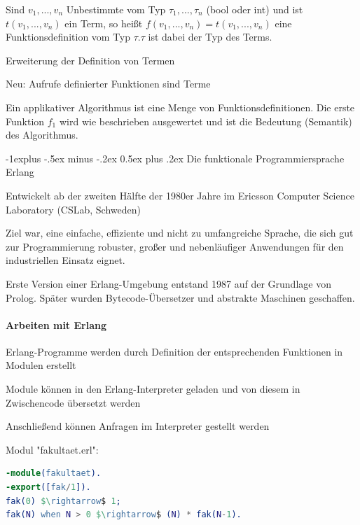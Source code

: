 \documentclass[10pt]{article}
\makeatletter
\renewcommand{\subsection}{\@startsection{subsection}{2}{0mm}%
                                {-1explus -.5ex minus -.2ex}%
                                {0.5ex plus .2ex}%
                                {\normalfont\normalsize\bfseries}}
\makeatother
\begin{document}
Sind $v_1, ..., v_n$ Unbestimmte vom Typ $\tau_1,...,\tau_n$ (bool oder int) und ist $t(v_1, ..., v_n)$ ein Term, so heißt $f(v_1, ..., v_n) = t(v_1, ..., v_n)$ eine Funktionsdefinition vom Typ $\tau .\tau$ ist dabei der Typ des Terms.

\begin{itemize*}
  \item Erweiterung der Definition von Termen
  \item Neu: Aufrufe definierter Funktionen sind Terme
\end{itemize*}

Ein applikativer Algorithmus ist eine Menge von Funktionsdefinitionen. Die erste Funktion $f_1$ wird wie beschrieben ausgewertet und ist die Bedeutung (Semantik) des Algorithmus.

\subsection{Die funktionale Programmiersprache Erlang}
\begin{itemize*}
  \item Entwickelt ab der zweiten Hälfte der 1980er Jahre im Ericsson Computer Science Laboratory (CSLab, Schweden)
  \item Ziel war, eine einfache, effiziente und nicht zu umfangreiche Sprache, die sich gut zur Programmierung robuster, großer und nebenläufiger Anwendungen für den industriellen Einsatz eignet.
  \item Erste Version einer Erlang-Umgebung entstand 1987 auf der Grundlage von Prolog. Später wurden Bytecode-Übersetzer und abstrakte Maschinen geschaffen.
\end{itemize*}

\paragraph{Arbeiten mit Erlang}

\begin{itemize*}
  \item Erlang-Programme werden durch Definition der entsprechenden Funktionen in Modulen erstellt
  \item Module können in den Erlang-Interpreter geladen und von diesem in Zwischencode übersetzt werden
  \item Anschließend können Anfragen im Interpreter gestellt werden
\end{itemize*}

Modul "fakultaet.erl":
\begin{lstlisting}[language=erlang]
-module(fakultaet).
-export([fak/1]).
fak(0) $\rightarrow$ 1;
fak(N) when N > 0 $\rightarrow$ (N) * fak(N-1).
\end{lstlisting}
\end{document}

